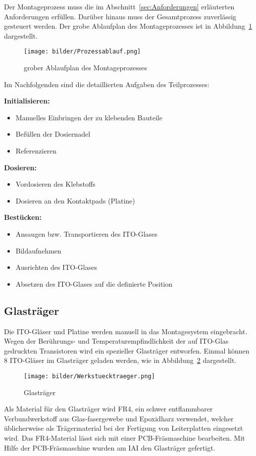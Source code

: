 Der Montageprozess muss die im Abschnitt~\ref{sec:Anforderungen} erläuterten Anforderungen erfüllen. Darüber hinaus muss der Gesamtprozess zuverlässig gesteuert werden. Der grobe Ablaufplan des Montageprozesses ist in Abbildung~\ref{fig:Prozessablauf} dargestellt.

\begin{figure}[H]
    \centering
    \texttt{[image: bilder/Prozessablauf.png]}
    \caption{grober Ablaufplan des Montageprozesses}
    \label{fig:Prozessablauf}
\end{figure}

Im Nachfolgenden sind die detaillierten Aufgaben des Teilprozesses: 

{\bf Initialisieren:}
\begin{itemize}
    \item Manuelles Einbringen der zu klebenden Bauteile
    \item Befüllen der Dosiernadel
    \item Referenzieren
\end{itemize}
{\bf Dosieren:}
\begin{itemize}
    \item Vordosieren des Klebstoffs
    \item Dosieren an den Kontaktpads (Platine)
\end{itemize}
{\bf Bestücken:}
\begin{itemize}
    \item Ansaugen bzw. Transportieren des ITO-Glases
    \item Bildaufnehmen
    \item Ausrichten des ITO-Glases
    \item Absetzen des ITO-Glases auf die definierte Position
\end{itemize}



\subsection{Glasträger}
Die ITO-Gläser und Platine werden manuell in das Montagesystem eingebracht. Wegen der Berührungs- und Temperaturempfindlichkeit der auf ITO-Glas gedruckten Transistoren wird ein spezieller Glasträger entworfen. Einmal können 8 ITO-Gläser im Glasträger geladen werden, wie in Abbildung~\ref{fig:werkstuecktraeger} dargestellt. 
\begin{figure}[H]
    \centering
    \texttt{[image: bilder/Werkstuecktraeger.png]}
    \caption{Glasträger}
    \label{fig:werkstuecktraeger}
\end{figure}
Als Material für den Glasträger wird FR4, ein schwer entflammbarer Verbundwerkstoff aus Glas-fasergewebe und Epoxidharz verwendet, welcher üblicherweise als Trägermaterial bei der Fertigung von Leiterplatten eingesetzt wird. Das FR4-Material lässt sich mit einer PCB-Fräsmaschine bearbeiten. Mit Hilfe der PCB-Fräsmaschine wurden am IAI den Glasträger gefertigt. 

